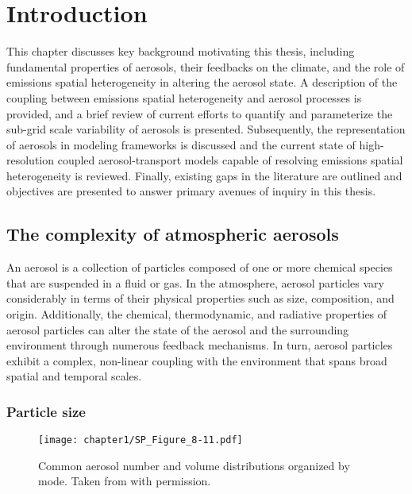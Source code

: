 \chapter{Introduction}

This chapter discusses key background motivating this thesis, including fundamental properties of aerosols, their feedbacks on the climate, and the role of emissions spatial heterogeneity in altering the aerosol state. A description of the coupling between emissions spatial heterogeneity and aerosol processes is provided, and a brief review of current efforts to quantify and parameterize the sub-grid scale variability of aerosols is presented. Subsequently, the representation of aerosols in modeling frameworks is discussed and the current state of high-resolution coupled aerosol-transport models capable of resolving emissions spatial heterogeneity is reviewed. Finally, existing gaps in the literature are outlined and objectives are presented to answer primary avenues of inquiry in this thesis. 

\section{The complexity of atmospheric aerosols}\label{aerosol_properties}

An aerosol is a collection of particles composed of one or more chemical species that are suspended in a fluid or gas. In the atmosphere, aerosol particles vary considerably in terms of their physical properties such as size, composition, and origin. Additionally, the chemical, thermodynamic, and radiative properties of aerosol particles can alter the state of the aerosol and the surrounding environment through numerous feedback mechanisms. In turn, aerosol particles exhibit a complex, non-linear coupling with the environment that spans broad spatial and temporal scales.

\subsection{Particle size}

\begin{figure}[!t]
	\centering
	\texttt{[image: chapter1/SP\_Figure\_8-11.pdf]}
	\caption{Common aerosol number and volume distributions organized by mode. Taken from \textcite{seinfeld_atmospheric_1998} with permission.}
	\label{fig:size_dists}
\end{figure} 

